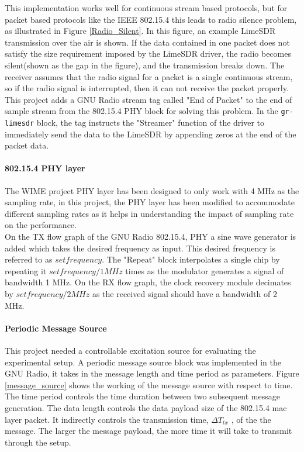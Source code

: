 This implementation works well for continuous stream based protocols, but for packet based protocols like the IEEE 802.15.4 this leads to radio silence problem, as illustrated in Figure \ref{Radio_Silent}.
In this figure, an example LimeSDR transmission over the air is shown.
If the data contained in one packet does not satisfy the size requirement imposed by the LimeSDR driver, the radio becomes silent(shown as the gap in the figure), and the transmission breaks down.
The receiver assumes that the radio signal for a packet is a single continuous stream, so if the radio signal is interrupted, then it can not receive the packet properly.\\

This project adds a GNU Radio stream tag called "End of Packet" to the end of sample stream from the 802.15.4 PHY block for solving this problem.
In the \texttt{gr-limesdr} block, the tag instructs the "Streamer" function of the driver to immediately send the data to the LimeSDR by appending zeros at the end of the packet data.

\paragraph{802.15.4 \ac{PHY} layer}

The WIME project \ac{PHY} layer has been designed to only work with 4 MHz as the sampling rate, in this project, the \ac{PHY} layer has been modified to accommodate different sampling rates as it helps in understanding the impact of sampling rate on the performance.\\

On the TX flow graph of the GNU Radio 802.15.4, \ac{PHY} a sine wave generator is added which takes the desired frequency as input.
This desired frequency is referred to as $set frequency$.
The "Repeat" block interpolates a single chip by repeating it $set frequency/1 MHz$ times as the modulator generates a signal of bandwidth 1 MHz.
On the RX flow graph, the clock recovery module decimates by $set frequency/2 MHz$ as the received signal should have a bandwidth of 2 MHz.

\paragraph{Periodic Message Source} \label{Periodic Message Source}
This project needed a controllable excitation source for evaluating the experimental setup.
A periodic message source block was implemented in the GNU Radio, it takes in the message length and time period as parameters.
Figure \ref{message_source} shows the working of the message source with respect to time.
The time period controls the time duration between two subsequent message generation.
The data length controls the data payload size of the 802.15.4 \ac{mac} layer packet.
It indirectly controls the transmission time, $\Delta T_{tx}$ , of the the message.
The larger the message payload, the more time it will take to transmit through the setup. 
\\


